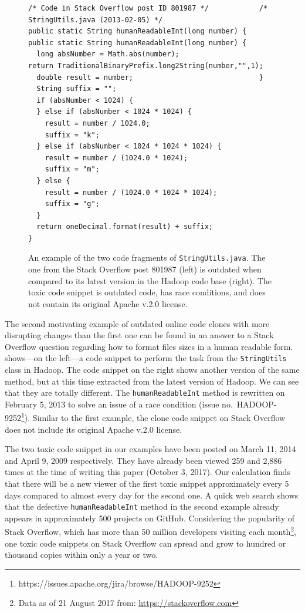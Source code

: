 \documentclass[10pt,journal,compsoc]{IEEEtran}
\begin{document}
\begin{figure}
	\begin{lstlisting}
/* Code in Stack Overflow post ID 801987 */            /* StringUtils.java (2013-02-05) */
public static String humanReadableInt(long number) {   public static String humanReadableInt(long number) {
  long absNumber = Math.abs(number);                     return TraditionalBinaryPrefix.long2String(number,"",1);
  double result = number;                              }
  String suffix = "";
  if (absNumber < 1024) {
  } else if (absNumber < 1024 * 1024) {
    result = number / 1024.0;
    suffix = "k";
  } else if (absNumber < 1024 * 1024 * 1024) {
    result = number / (1024.0 * 1024);
    suffix = "m";
  } else {
    result = number / (1024.0 * 1024 * 1024);
    suffix = "g";
  }
  return oneDecimal.format(result) + suffix;
}
	\end{lstlisting}\vspace{-2ex}
	\caption{An example of the two code fragments of
		{\small\texttt{StringUtils.java}}. The one from the
		Stack Overflow post 801987 (left) is outdated when compared to
		its latest version in the \textsf{Hadoop} code base
		(right). The toxic code snippet is outdated code, has race conditions, and does not contain its
		original Apache v.2.0 license.}
	\label{fig:before-after_2}
\end{figure}

The second motivating example of outdated online code clones with more
disrupting changes than the first one  can be found in an answer to a Stack
Overflow question regarding how to format files sizes in a human readable form.
 shows---on the left---a code snippet to perform the
task from the {\small{\texttt{StringUtils}}} class in \textsf{Hadoop}. The code snippet on the
right shows another version of the same method, but at this time extracted from
the latest version of \textsf{Hadoop}. We can see that
they are totally different. The {\small{\texttt{humanReadableInt}}} method is
rewritten on February 5, 2013 to solve an issue of a race condition
(issue no.~HADOOP-9252\footnote{https://issues.apache.org/jira/browse/HADOOP-9252}).
Similar to the first example, the clone code snippet on Stack Overflow does not 
include its original Apache v.2.0 license.

The two toxic code snippet in our examples have been posted on March 11, 2014 and
April 9, 2009 respectively. They have already been viewed 259 and 2,886 times at
the time of writing this paper (October 3, 2017). Our calculation finds that
there will be a new viewer of the first toxic snippet approximately every 5
days compared to almost every day for the second one. A quick web search shows
that the defective {\small{\texttt{humanReadableInt}}} method in the second
example already appears in approximately 500 projects on GitHub. Considering the
popularity of Stack Overflow, which has more than 50 million developers visiting
each month\footnote{Data as of 21 August 2017 from:
	\url{https://stackoverflow.com}}, one toxic code snippets on Stack Overflow can
spread and grow to hundred or thousand copies within only a year or two.
\end{document}

